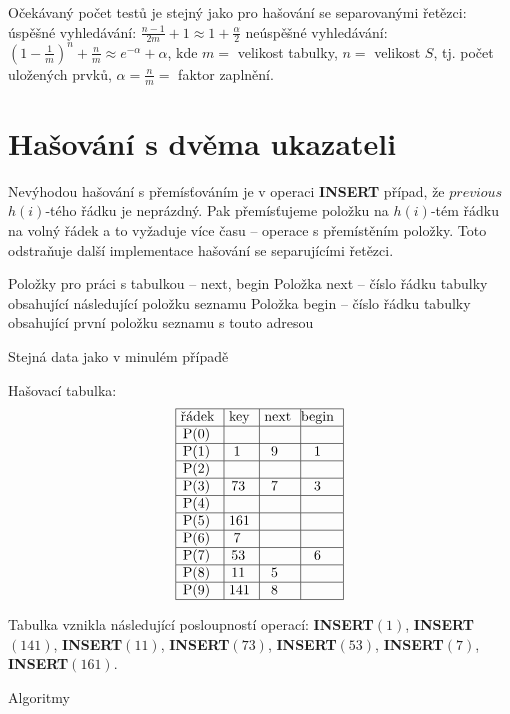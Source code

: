 \documentclass[a4paper,12pt]{article}
\begin{document}
Očekávaný počet testů je stejný jako pro 
hašování se se\-pa\-ro\-va\-ný\-mi řetězci:\newline 
\phantom{---}úspěšné vyhledávání: $\frac {n-1}{
2m}+1\approx 1+\frac {\alpha}2$\newline 
\phantom{---}neúspěšné vyhledávání: $(1-\frac 1
m)^n+\frac nm\approx e^{-\alpha}+\alpha$,\newline 
kde $m=$ velikost tabulky, $n=$ velikost $S$, tj. počet uložených 
prvků, $\alpha =\frac nm=$ faktor zaplnění.

\section{Hašování s dvěma ukazateli}

Nevýhodou hašování s přemís\v továním je v operaci 
{\bf INSERT} případ, že $previous$ $h(i)$-tého řádku je neprázdný. Pak přemís\v tujeme položku na $h(i)$-tém řádku na volný řádek a to vyžaduje více času -- operace s přemístěním 
položky. Toto odstraňuje další implementace hašování se 
separujícími řetězci.

Položky pro práci s tabulkou -- next, 
begin\newline 
\phantom{---}Položka next -- číslo řádku tabulky obsahující 
následující polož\-ku seznamu\newline 
\phantom{---}Položka begin -- číslo řádku tabulky obsahující první položku seznamu 
s touto adresou\newline 

Stejná data jako v minulém případě\newline 

Hašovací tabulka:
$$\vtop{\offinterlineskip\halign {\strut\vrule\ # & \vrule\ # & \vrule\ # & \vrule \hfil # \hfil \vrule\cr\noalign{\hrule}řádek & key & next & begin \hfil \cr\noalign{\hrule}P(0) & & & \hfill \cr\noalign{\hrule}P(1) & 1 & 9 & 1 \cr\noalign{\hrule}P(2) & & & \hfill \cr\noalign{\hrule}P(3) & 73 & 7 & 3 \cr\noalign{\hrule}P(4) & & &\hfill \cr\noalign{\hrule}P(5) & 161 & & \hfill \cr\noalign{\hrule}P(6) & 7 & & \hfill \cr\noalign{\hrule}P(7) & 53 & & 6 \cr\noalign{\hrule}P(8) & 11 & 5 & \hfill \cr\noalign{\hrule}P(9) & 141 & 8 & \hfill \cr\noalign{\hrule}}}$$

Tabulka vznikla následující posloupností 
operací:\newline 
{\bf INSERT$(1)$}, {\bf INSERT$(141)$}, {\bf INSERT$(11)$}, {\bf INSERT$
(73)$}, 
{\bf INSERT$(53)$}, {\bf INSERT$(7)$}, {\bf INSERT$(161)$}. 

\subhead
Algoritmy
\endsubhead
\end{document}
